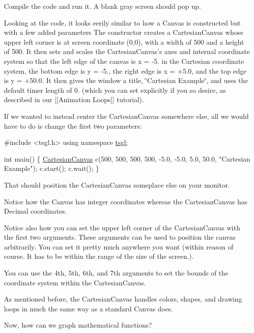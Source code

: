 Compile the code and run it. A blank gray screen should pop up.

Looking at the code, it looks eerily similar to how a Canvas is constructed but with a few added parameters The constructor creates a Cartesian\+Canvas whose upper left corner is at screen coordinate (0,0), with a width of 500 and a height of 500. It then sets and scales the Cartesian\+Canvas’s axes and internal coordinate system so that the left edge of the canvas is x = -\/5. in the Cartesian coordinate system, the bottom edge is y = -\/5., the right edge is x = +5.0, and the top edge is y = +50.0. It then gives the window a title, \char`\"{}\+Cartesian Example\char`\"{}, and uses the default timer length of 0. (which you can set explicitly if you so desire, as described in our \mbox{[}\mbox{[}Animation Loops\mbox{]}\mbox{]} tutorial).

If we wanted to instead center the Cartesian\+Canvas somewhere else, all we would have to do is change the first two parameters\+:


\begin{DoxyCode}
\textcolor{preprocessor}{#include <tsgl.h>}
\textcolor{keyword}{using namespace }\hyperlink{namespacetsgl}{tsgl};

\textcolor{keywordtype}{int} main() \{
  \hyperlink{classtsgl_1_1_cartesian_canvas}{CartesianCanvas} c(500, 500, 500, 500, -5.0, -5.0, 5.0, 50.0, \textcolor{stringliteral}{"Cartesian Example"});
  c.start();
  c.wait();
\}
\end{DoxyCode}


That should position the Cartesian\+Canvas someplace else on your monitor.

Notice how the Canvas has integer coordinates whereas the Cartesian\+Canvas has Decimal coordinates.

Notice also how you can set the upper left corner of the Cartesian\+Canvas with the first two arguments. These arguments can be used to position the canvas arbitrarily. You can set it pretty much anywhere you want (within reason of course. It has to be within the range of the size of the screen.).

You can use the 4th, 5th, 6th, and 7th arguments to set the bounds of the coordinate system within the Cartesian\+Canvas.

As mentioned before, the Cartesian\+Canvas handles colors, shapes, and drawing loops in much the same way as a standard Canvas does.

Now, how can we graph mathematical functions?

